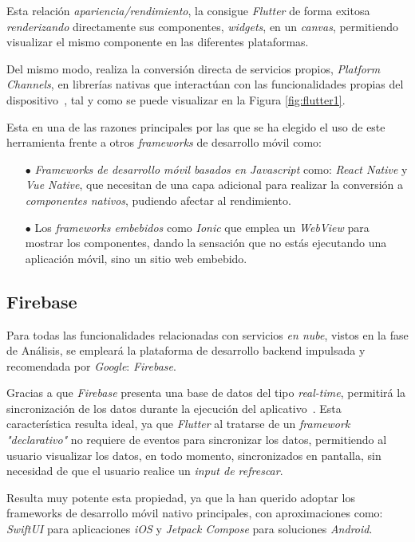 Esta relación \textit{apariencia/rendimiento}, la consigue \textit{Flutter} de forma exitosa
\textit{renderizando} directamente sus componentes, 
\textit{widgets}, en un \textit{canvas}, permitiendo visualizar el mismo componente en las diferentes plataformas.

Del mismo modo, realiza la conversión directa de servicios propios, \textit{Platform Channels}, en librerías nativas que
interactúan con las funcionalidades propias del dispositivo~\cite{leler2019s}, 
tal y como se puede visualizar en la Figura \ref{fig:flutter1}.

Esta en una de las razones principales por las que se ha elegido el uso de este herramienta frente a otros 
\textit{frameworks} de desarrollo móvil como: 

\begin{itemize}
    \item[$\bullet$] \textit{Frameworks de desarrollo móvil basados en Javascript} como: \textit{React Native} y 
    \textit{Vue Native}, que necesitan de una
    capa adicional para realizar la conversión a \textit{componentes nativos}, pudiendo afectar al rendimiento.
    \item[$\bullet$] Los \textit{frameworks embebidos} como
    \textit{Ionic} que emplea un \textit{WebView} para mostrar los componentes, dando la sensación que no estás ejecutando
    una aplicación móvil, sino un sitio web embebido.
 \end{itemize}

 \subsection{Firebase}
 Para todas las funcionalidades relacionadas con servicios \textit{en nube}, vistos en la fase de Análisis,
 se empleará la plataforma de desarrollo backend impulsada y recomendada por \textit{Google}: \textit{Firebase}.

Gracias a que \textit{Firebase} presenta una base de datos del tipo \textit{real-time}, permitirá 
la sincronización de los datos durante la ejecución del
aplicativo~\cite{khawas2018application}. Esta característica resulta ideal, ya que
\textit{Flutter} al tratarse de un \textit{framework "declarativo"} no requiere de eventos para
sincronizar los datos, permitiendo al usuario visualizar los datos, en todo momento, sincronizados en pantalla,
sin necesidad de que el usuario realice un \textit{input de refrescar}.

Resulta muy potente esta propiedad, ya que la han querido adoptar los frameworks de desarrollo móvil nativo principales,
con aproximaciones como: \textit{SwiftUI} para aplicaciones \textit{iOS} y \textit{Jetpack Compose} para soluciones \textit{Android}.

